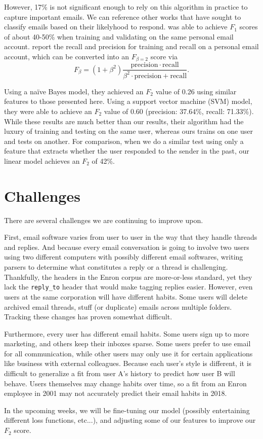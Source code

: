 \documentclass[10pt]{article}
\begin{document}
However, 17\% is not significant enough to rely on this algorithm in practice to capture important emails. We can reference other works that have sought to classify emails based on their likelyhood to respond. \cite{knight:2014} was able to achieve $F_1$ scores of about 40-50\% when training and validating on the same personal email account. \cite{bromberg:2013} report the recall and precision for training and recall on a personal email account, which can be converted into an $F_{\beta = 2}$ score via
$$
F_\beta = (1+\beta^2)\frac{\mathrm{precision} \cdot \mathrm{recall}}{\beta^2 \cdot \mathrm{precision} + \mathrm{recall}}.
$$

Using a na\"ive Bayes model, they achieved an $F_2$ value of 0.26 using similar features to those presented here. Using a support vector machine (SVM) model, they were able to achieve an $F_2$ value of 0.60 (precision: 37.64\%,
recall: 71.33\%). While these results are much better than our results, their algorithm had the luxury of training and testing on the same user, whereas ours trains on one user and tests on another. For comparison, when we do a similar test using only a feature that extracts whether the user responded to the sender in the past, our linear model achieves an $F_2$ of 42\%.

\section*{Challenges}

There are several challenges we are continuing to improve upon. 

First, email software varies from user to user in the way that they handle threads and replies. And because every email conversation is going to involve two users using two different computers with possibly different email softwares, writing parsers to determine what constitutes a reply or a thread is challenging. Thankfully, the headers in the Enron corpus are more-or-less standard, yet they lack the \texttt{reply\_to} header that would make tagging replies easier. However, even users at the same corporation will have different habits. Some users will delete archived email threads, stuff (or duplicate) emails across multiple folders. Tracking these changes has proven somewhat difficult.

Furthermore, every user has different email habits. Some users sign up to more marketing, and others keep their inboxes sparse. Some users prefer to use email for all communication, while other users may only use it for certain applications like business with external colleagues. Because each user's style is different, it is difficult to generalize a fit from user A's history to predict how user B will behave. Users themselves may change habits over time, so a fit from an Enron employee in 2001 may not accurately predict their email habits in 2018.

In the upcoming weeks, we will be fine-tuning our model (possibly entertaining different loss functions, etc...), and adjusting some of our features to improve our $F_2$ score.

 

\end{document}
